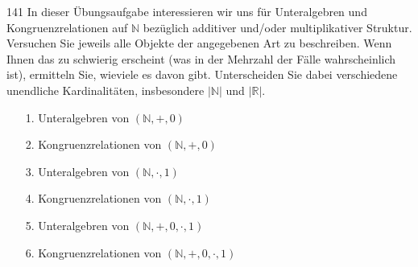 \begin{algebraUE}{141}
In dieser Übungsaufgabe interessieren wir uns für Unteralgebren und Kongruenzrelationen
auf $\mathbb{N}$ bezüglich additiver und/oder multiplikativer Struktur. Versuchen
Sie jeweils alle Objekte der angegebenen Art zu beschreiben. Wenn Ihnen das zu
schwierig erscheint (was in der Mehrzahl der Fälle wahrscheinlich ist), ermitteln
Sie, wieviele es davon gibt. Unterscheiden Sie dabei verschiedene unendliche
Kardinalitäten, insbesondere $|\mathbb{N}|$ und $|\mathbb{R}|$.
\begin{itemize}
  \item [1.] Unteralgebren von $(\mathbb{N},+,0)$
  \item [2.] Kongruenzrelationen von $(\mathbb{N},+,0)$
  \item [3.] Unteralgebren von $(\mathbb{N},\cdot,1)$
  \item [4.] Kongruenzrelationen von $(\mathbb{N},\cdot,1)$
  \item [5.] Unteralgebren von $(\mathbb{N},+,0,\cdot,1)$
  \item [6.] Kongruenzrelationen von $(\mathbb{N},+,0,\cdot,1)$
\end{itemize}
\end{algebraUE}
